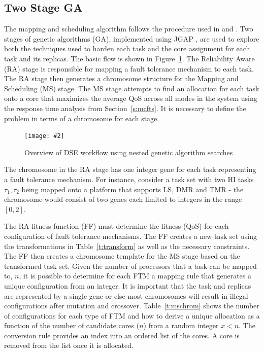 \documentclass[conference]{IEEEtran}
\newcommand{\addfigure}[4]{
\begin{figure}[fh]
	\centering
	\texttt{[image: \#2]}
	\caption{#3}
	\label{#4}
\end{figure}
}
\begin{document}
\subsection{Two Stage GA}
	The mapping and scheduling algorithm follows the procedure used in \cite{bolchini2013reliability} and \cite{kang2014reliability}. 
	Two stages of genetic algorithms (GA), implemented using JGAP \cite{jgap}, are used to explore both the techniques used to harden each task and the core assignment for each task and its replicas. 
	The basic flow is shown in Figure~\ref{f:dse}. 
	The Reliability Aware (RA) stage is responsible for mapping a fault tolerance mechanism to each task. 
	The RA stage then generates a chromosome structure for the Mapping and Scheduling (MS) stage. 
	The MS stage attempts to find an allocation for each task onto a core that maximizes the average QoS across all modes in the system using the response time analysis from Section~\ref{s:mcfts}.
	It is necessary to define the problem in terms of a chromosome for each stage.
	
\addfigure{0.6}{dse.pdf}{Overview of DSE workflow using nested genetic algorithm searches}{f:dse}
	
	The chromosome in the RA stage has one integer gene for each task representing a fault tolerance mechanism. 
	For instance, consider a task set with two HI tasks ${\tau_1,\tau_2}$ being mapped onto a platform that supports LS, DMR and TMR - the chromosome would consist of two genes each limited to integers in the range $[0,2]$. 
	
	The RA fitness function (FF) must determine the fitness (QoS) for each configuration of fault tolerance mechanisms. 
	The FF creates a new task set using the transformations in Table~\ref{t:transform} as well as the necessary constraints. 
	The FF then creates a chromosome template for the MS stage based on the transformed task set. 
	Given the number of processors that a task can be mapped to, $n$, it is possible to determine for each FTM a mapping rule that generates a unique configuration from an integer. 
	It is important that the task and replicas are represented by a single gene or else most chromosomes will result in illegal configurations after mutation and crossover. 
	Table~\ref{t:mschrom} shows the number of configurations for each type of FTM and how to derive a unique allocation as a function of the number of candidate cores ($n$) from a random integer $x < n$. 
	The conversion rule provides an index into an ordered list of the cores. A core is removed from the list once it is allocated.
	
\end{document}
